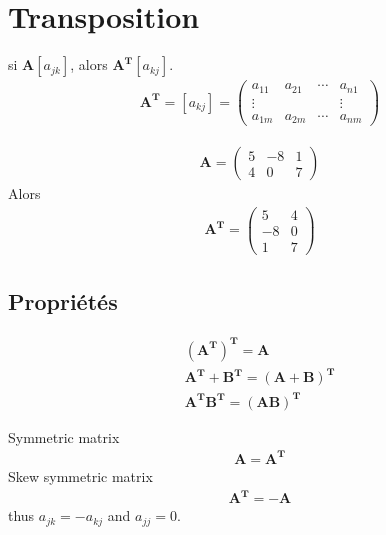 \section{Transposition}
\begin{myDefinition}
	si $\mathbf{A}[a_{jk}]$, alors $\mathbf{A^T}[a_{kj}]$.
	\begin{eqnarray}
		\mathbf{A^T}=[a_{kj}]=
		\begin{pmatrix}
			a_{11} & a_{21} & \cdots & a_{n1}
			\\
			\vdots & & &\vdots
			\\
			a_{1m} & a_{2m} &\cdots & a_{nm}
		\end{pmatrix}
	\end{eqnarray}
\end{myDefinition}
\begin{myExample}
	\begin{eqnarray*}
		\mathbf{A}=
		\begin{pmatrix}
			5 & -8 & 1
			\\
			4 & 0 & 7
		\end{pmatrix}
	\end{eqnarray*}
	Alors
	\begin{eqnarray*}
		\mathbf{A^T}=
		\begin{pmatrix}
			5 & 4\\
			-8&0\\
			1& 7
		\end{pmatrix}
	\end{eqnarray*}
\end{myExample}

\subsection{Propriétés}
\begin{eqnarray}
	\mathbf{(A^T)^T}=\mathbf{A}
	\\
	\mathbf{A^T}+\mathbf{B^T}=\mathbf{(A+B)^T}\\
	\mathbf{A^TB^T}=\mathbf{(AB)^T}
\end{eqnarray}

\begin{myDefinition}
	Symmetric matrix
	\begin{eqnarray}
		\mathbf{A}=\mathbf{A^T}
	\end{eqnarray}
	Skew symmetric matrix
	\begin{eqnarray}
		\mathbf{A^T}=-\mathbf{A}
	\end{eqnarray}
	thus $a_{jk}=-a_{kj}$ and $a_{jj}=0$.
\end{myDefinition}

